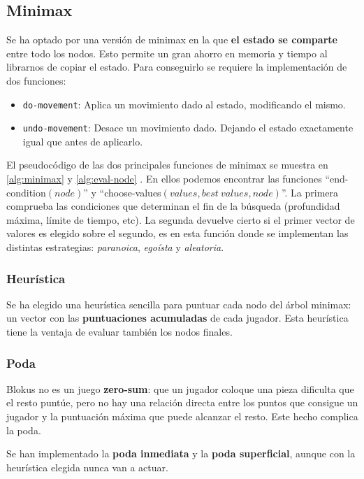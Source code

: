 \subsection{Minimax}

Se ha optado por una versión de minimax en la que \textbf{el estado se comparte}
entre todo los nodos. Esto permite un gran ahorro en memoria y tiempo al
librarnos de copiar el estado. Para conseguirlo se requiere la implementación de
dos funciones:

\begin{itemize}
	\item \texttt{do-movement}: Aplica un movimiento dado al estado,
		modificando el mismo.
	\item \texttt{undo-movement}: Desace un movimiento dado. Dejando el
		estado exactamente igual que antes de aplicarlo.
\end{itemize}

El pseudocódigo de las dos principales funciones de minimax se muestra en
\ref{alg:minimax} y \ref{alg:eval-node} . En ellos podemos encontrar las
funciones ``end-condition$(node)$'' y ``choose-values$(values, best\ values,
node)$''. La primera comprueba las condiciones que determinan el fin de la
búsqueda (profundidad máxima, límite de tiempo, etc). La segunda devuelve
cierto si el primer vector de valores es elegido sobre el segundo, es en esta
función donde se implementan las distintas estrategias: \textsl{paranoica},
\textsl{egoísta} y \textsl{aleatoria}.

\subsubsection{Heurística}
Se ha elegido una heurística sencilla para puntuar cada nodo del árbol minimax:
un vector con las \textbf{puntuaciones acumuladas} de cada jugador. Esta
heurística tiene la ventaja de evaluar también los nodos finales.

\subsubsection{Poda}
Blokus no es un juego \textbf{zero-sum}: que un jugador coloque una pieza
dificulta que el resto puntúe, pero no hay una relación directa entre los puntos
que consigue un jugador y la puntuación máxima que puede alcanzar el resto. Este
hecho complica la poda.

Se han implementado la \textbf{poda inmediata} y la \textbf{poda superficial},
aunque con la heurística elegida nunca van a actuar.

